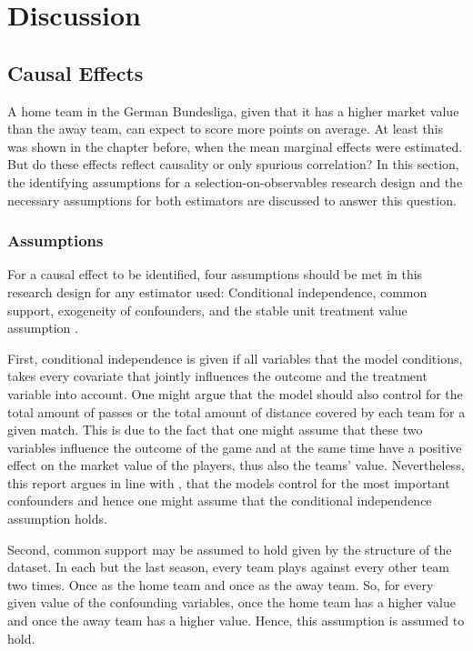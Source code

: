 \documentclass[11pt]{article}
\begin{document}

\section{Discussion}

\subsection{Causal Effects}
A home team in the German Bundesliga, given that it has a higher market value than the away team, can expect to score more points on average. At least this was shown in the chapter before, when the mean marginal effects were estimated. But do these effects reflect causality or only spurious correlation? In this section, the identifying assumptions for a selection-on-observables research design and the necessary assumptions for both estimators are discussed to answer this question.

\subsubsection*{Assumptions}

For a causal effect to be identified, four assumptions should be met in this research design for any estimator used: Conditional independence, common support, exogeneity of confounders, and the stable unit treatment value assumption \cite[p. 16f]{lechner2021_da2}.

First, conditional independence is given if all variables that the model conditions, takes every covariate that jointly influences the outcome and the treatment variable into account. One might argue that the model should also control for the total amount of passes or the total amount of distance covered by each team for a given match. This is due to the fact that one might assume that these two variables influence the outcome of the game and at the same time have a positive effect on the market value of the players, thus also the teams' value. Nevertheless, this report argues in line with , that the models control for the most important confounders and hence one might assume that the conditional independence assumption holds.

Second, common support may be assumed to hold given by the structure of the dataset. In each but the last season, every team plays against every other team two times. Once as the home team and once as the away team. So, for every given value of the confounding variables, once the home team has a higher value and once the away team has a higher value. Hence, this assumption is assumed to hold.
\end{document}
